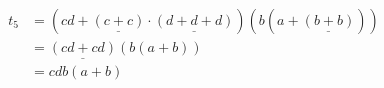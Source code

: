 \begin{align*}
t_5&=(cd + \underline{(c+c)}\cdot \underline{(d+d+d)})(b(a+\underline{(b+b)}))\\
&=\underline{(cd + cd)}(b(a+b))\\
&=cdb(a+b)\\
\end{align*}

